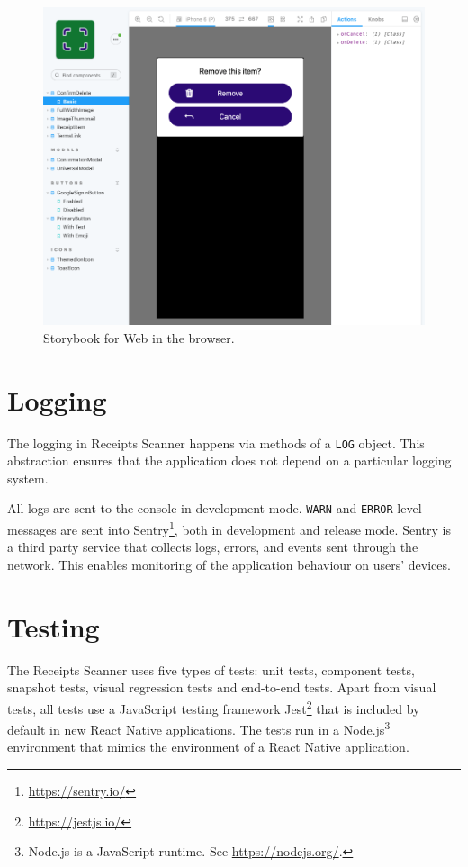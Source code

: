 \documentclass[
  digital, %
  table,   %
  oneside, %
  lof,     %
  lot,     %
]{fithesis3}
\begin{document}
\begin{figure}
    \begin{center}
        \includegraphics[width=\textwidth]{figures/other/storybook_web}
    \end{center}
    \caption{Storybook for Web in the browser.}
    \label{fig:storybook_web}
\end{figure}

\section{Logging}
The logging in Receipts Scanner happens via methods of a \texttt{LOG} object. This abstraction ensures that the application does not depend on a particular logging system.

All logs are sent to the console in development mode. \texttt{WARN} and \texttt{ERROR} level messages are sent into Sentry\footnote{\url{https://sentry.io/}}, both in development and release mode. Sentry is a third party service that collects logs, errors, and events sent through the network. This enables monitoring of the application behaviour on users' devices.

\section{Testing}
The Receipts Scanner uses five types of tests: unit tests, component tests, snapshot tests, visual regression tests and end-to-end tests.
Apart from visual tests, all tests use a JavaScript testing framework Jest\footnote{\url{https://jestjs.io/}} that is included by default in new React Native applications. The tests run in a Node.js\footnote{Node.js is a JavaScript runtime. See \url{https://nodejs.org/}.} environment that mimics the environment of a React Native application. 
\end{document}
